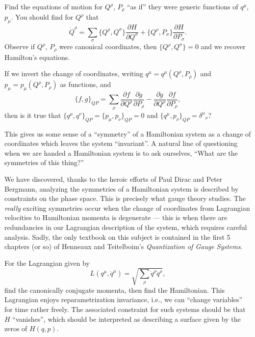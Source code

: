 \begin{exercise}
Find the equations of motion for $Q^{\rho}$, $P_{\rho}$ ``as if'' they
were generic functions of $q^{\mu}$, $p_{\mu}$. You should find for
$Q^{\rho}$ that
\begin{equation}
\dot{Q}^{\rho} = \sum_{\sigma}\{Q^{\rho}, Q^{\sigma}\}\frac{\partial H}{\partial Q^{\sigma}}
+\{Q^{\rho}, P_{\sigma}\}\frac{\partial H}{\partial P_{\sigma}}.
\end{equation}
Observe if $Q^{\rho}$, $P_{\rho}$ were canonical coordinates, then $\{Q^{\rho},Q^{\sigma}\}=0$
and we recover Hamilton's equations.
\end{exercise}

\begin{exercise}
If we invert the change of coordinates, writing
$q^{\mu}=q^{\mu}(Q^{\rho}, P_{\rho})$ and $p_{\mu}=p_{\mu}(Q^{\rho}, P_{\rho})$
as functions, and
\begin{equation}
\{f, g\}_{QP} = \sum_{\rho}\frac{\partial f}{\partial Q^{\rho}}\frac{\partial g}{\partial P_{\rho}}
- \frac{\partial g}{\partial Q^{\rho}}\frac{\partial f}{\partial P_{\rho}},
\end{equation}
then is it true that $\{q^{\mu},q^{\nu}\}_{QP}=\{p_{\mu},p_{\nu}\}_{QP}=0$
and $\{q^{\mu},p_{\nu}\}_{QP}={\delta^{\mu}}_{\nu}$?
\end{exercise}

\M
This gives us some sense of a ``symmetry'' of a Hamiltonian system as a
change of coordinates which leaves the system ``invariant''. A natural
line of questioning when we are handed a Hamiltonian system is to ask
ourselves, ``What are the symmetries of this thing?''

We have discovered, thanks to the heroic efforts of Paul Dirac and Peter
Bergmann, analyzing the symmetries of a Hamiltonian system is described
by constraints on the phase space. This is precisely what gauge theory
studies. The \emph{really} exciting symmetries occur when the change of
coordinates from Lagrangian velocities to Hamiltonian momenta is
degenerate --- this is when there are redundancies in our Lagrangian
description of the system, which requires careful analysis. Sadly, the
only textbook on this subject is contained in the first 5 chapters (or so) of
Henneaux and Teitelboim's \textit{Quantization of Gauge Systems}.

\begin{exercise}
  For the Lagrangian given by
  \begin{equation}
L(q^{\mu}, \dot{q}^{\mu}) = \sqrt{\sum_{\rho}\dot{q}^{\rho}\dot{q}^{\rho}},
  \end{equation}
  find the canonically conjugate momenta, then find the Hamiltonian.
  This Lagrangian enjoys reparametrization invariance, i.e., we can
  ``change variables'' for time rather freely. The associated constraint
  for such systems should be that $H$ ``vanishes'', which should be
  interpreted as describing a surface given by the zeros of $H(q,p)$.
\end{exercise}

